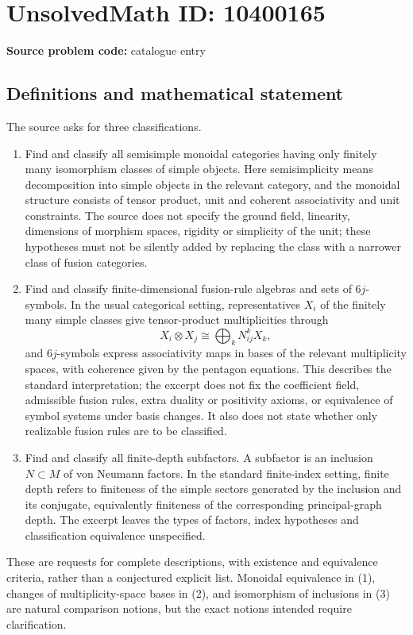 \documentclass[11pt]{article}
\begin{document}
\section*{UnsolvedMath ID: 10400165}
\textbf{Source problem code:} catalogue entry
\subsection{Definitions and mathematical statement}
The source asks for three classifications.
\begin{enumerate}
\item Find and classify all semisimple monoidal categories having only finitely many isomorphism classes of simple objects. Here semisimplicity means decomposition into simple objects in the relevant category, and the monoidal structure consists of tensor product, unit and coherent associativity and unit constraints. The source does not specify the ground field, linearity, dimensions of morphism spaces, rigidity or simplicity of the unit; these hypotheses must not be silently added by replacing the class with a narrower class of fusion categories.
\item Find and classify finite-dimensional fusion-rule algebras and sets of \(6j\)-symbols. In the usual categorical setting, representatives \(X_i\) of the finitely many simple classes give tensor-product multiplicities through
\[
 X_i\otimes X_j\cong\bigoplus_k N_{ij}^{k}X_k,
\]
and \(6j\)-symbols express associativity maps in bases of the relevant multiplicity spaces, with coherence given by the pentagon equations. This describes the standard interpretation; the excerpt does not fix the coefficient field, admissible fusion rules, extra duality or positivity axioms, or equivalence of symbol systems under basis changes. It also does not state whether only realizable fusion rules are to be classified.
\item Find and classify all finite-depth subfactors. A subfactor is an inclusion \(N\subset M\) of von Neumann factors. In the standard finite-index setting, finite depth refers to finiteness of the simple sectors generated by the inclusion and its conjugate, equivalently finiteness of the corresponding principal-graph depth. The excerpt leaves the types of factors, index hypotheses and classification equivalence unspecified.
\end{enumerate}
These are requests for complete descriptions, with existence and equivalence criteria, rather than a conjectured explicit list. Monoidal equivalence in (1), changes of multiplicity-space bases in (2), and isomorphism of inclusions in (3) are natural comparison notions, but the exact notions intended require clarification.
\end{document}
